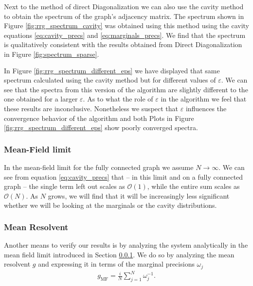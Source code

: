 \documentclass[../main.tex]{subfiles}
\begin{document}
Next to the method of direct Diagonalization we can also use the cavity method to obtain the spectrum of the graph's adjacency matrix.
The spectrum shown in Figure \ref{fig:rrg_spectrum_cavity} was obtained using this method using the cavity equations \eqref{eq:cavity_precs} and \eqref{eq:marginals_precs}.
We find that the spectrum is qualitatively consistent with the results obtained from Direct Diagonalization in Figure \ref{fig:spectrum_sparse}.
\par

In Figure \ref{fig:rrg_spectrum_different_eps} we have displayed that same spectrum calculated using the cavity method but for different values of $\varepsilon$.
We can see that the spectra from this version of the algorithm are slightly different to the one obtained for a larger $\varepsilon$.
As to what the role of $\varepsilon$ in the algorithm we feel that these results are inconclusive.
Nonetheless we suspect that $\varepsilon$ influences the convergence behavior of the algorithm and both Plots in Figure \ref{fig:rrg_spectrum_different_eps} show poorly converged spectra.
\par

\subsubsection{Mean-Field limit}
\label{sec:mean_field_limit}

In the mean-field limit for the fully connected graph we assume $N \to \infty$.
We can see from equation \eqref{eq:cavity_precs} that -- in this limit and on a fully connected graph -- the single term left out scales as $\mathcal{O}(1)$, while the entire sum scales as $\mathcal{O}(N)$.
As $N$ grows, we will find that it will be increasingly less significant whether we will be looking at the marginals or the cavity distributions.

\subsubsection{Mean Resolvent}

Another means to verify our results is by analyzing the system analytically in the mean field limit introduced in Section \ref{sec:mean_field_limit}.
We do so by analyzing the mean resolvent $g$ and expressing it in terms of the marginal precisions $\omega_j$
\begin{align}
    \label{eq:mean_resolvent}
    g_{ \text{MF} } = \frac{i}{N}\sum_{j=1}^{N} \omega_j^{-1}
.\end{align}
\end{document}
